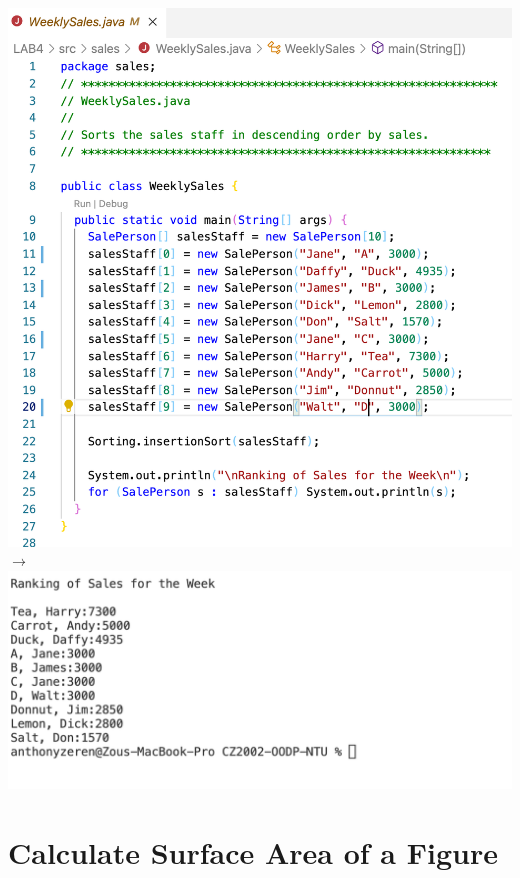 \documentclass[hidelinks,12pt]{article}
\begin{document}
\includegraphics[scale=0.35]{WeeklySalesCode.png}
$\longrightarrow$ 
\includegraphics[scale=0.4]{WeeklySalesResult.png}

\section{Calculate Surface Area of a Figure}
\end{document}
